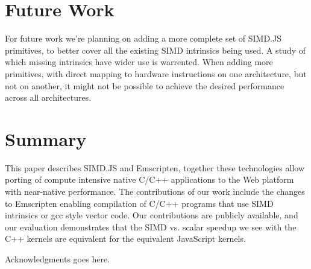 \documentclass[preprint]{sigplanconf}
\begin{document}
\section{Future Work}

For future work we're planning on adding a more complete set of SIMD.JS primitives, to
better cover all the existing SIMD intrinsics being used.  A study of which missing intrinsics
have wider use is warrented.  When adding more primitives, with direct mapping to
hardware instructions on one architecture, but not on another, it might not be possible to
achieve the desired performance across all architectures.

\section{Summary}

This paper describes SIMD.JS and Emscripten, together these technologies allow 
porting of compute intensive native C/C++ applications to the Web platform
with near-native performance. The contributions of our work include the changes to
Emscripten enabling compilation of C/C++ programs that use
SIMD intrinsics or gcc style vector code. Our contributions are publicly available, and
our evaluation demonstrates that the SIMD vs. scalar speedup we see with the C++ kernels
are equivalent for the equivalent JavaScript kernels.
 
\acks

Acknowledgments goes here.


%






\end{document}
